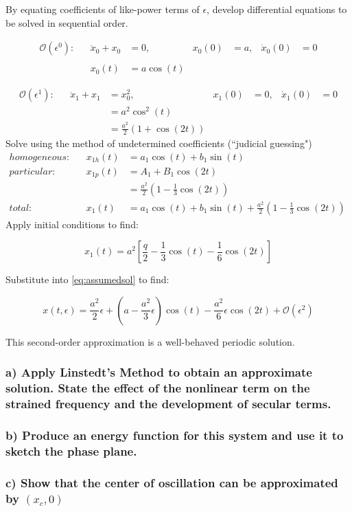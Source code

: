 By equating coefficients of like-power terms of $\epsilon$, develop differential equations to be solved in sequential order.

\begin{align}
	\mathcal{O}(\epsilon^0): && \ddot{x}_0+x_0 &= 0, & x_0(0) &= a, & \dot{x}_0(0) &= 0 \\ \nonumber
	\\
	&& x_0(t) &= a\cos(t)
\end{align}

\begin{align}
	\mathcal{O}(\epsilon^1): && \ddot{x}_1+x_1 &= x_0^2, & x_1(0) &= 0, & \dot{x}_1(0) &= 0 \\ \nonumber
	&& &= a^2\cos^2(t) \\ \nonumber
	&& &= \frac{a^2}{2}(1+\cos(2t))
\end{align}
Solve using the method of undetermined coefficients (``judicial guessing")
\begin{align}
	homogeneous: && x_{1h}(t) &= a_1\cos(t) + b_1\sin(t) &&&\\
	particular: && x_{1p}(t) &= A_1+B_1\cos(2t) &&& \\
	&& &= \frac{a^2}{2}(1-\frac{1}{3}\cos(2t)) \\
	total: && x_1(t) &= a_1\cos(t) + b_1\sin(t) + \frac{a^2}{2}(1-\frac{1}{3}\cos(2t))
\end{align}
Apply initial conditions to find:

\begin{equation}
	x_1(t) = a^2 \left[ \frac{q}{2}-\frac{1}{3}\cos(t)-\frac{1}{6}\cos(2t)\right]
\end{equation}

Substitute into \eqref{eq:assumedsol} to find:

\begin{equation}
	x(t,\epsilon) = \frac{a^2}{2}\epsilon+(a-\frac{a^2}{3}\epsilon)\cos(t)-\frac{a^2}{6}\epsilon\cos(2t)+\mathcal{O}(\epsilon^2)
\end{equation}

This second-order approximation is a well-behaved periodic solution.


\subsubsection*{a) Apply Linstedt's Method to obtain an approximate solution. State the effect of the nonlinear term on the strained frequency and the development of secular terms.}



\subsubsection*{b) Produce an energy function for this system and use it to sketch the phase plane.}



\subsubsection*{c) Show that the center of oscillation can be approximated by $(x_c,0)$}



\newpage